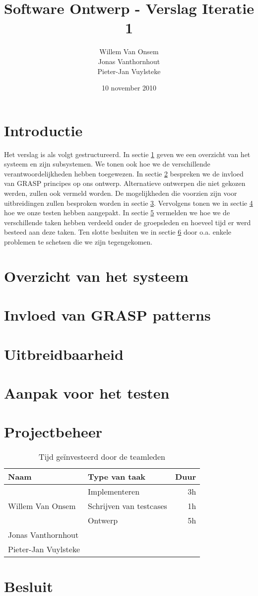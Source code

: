 \documentclass[a4paper, titlepage,12pt]{article}
\title{Software Ontwerp - Verslag Iteratie 1}
\author{Willem Van Onsem\\Jonas Vanthornhout\\Pieter-Jan Vuylsteke}
\date{10 november 2010}
\begin{document}
\begin{titlepage}
\maketitle
\end{titlepage}

\tableofcontents
\newpage
\section*{Introductie}
Het verslag is als volgt gestructureerd. In sectie \ref{overzicht} geven we een overzicht van het systeem en zijn subsystemen.
We tonen ook hoe we de verschillende verantwoordelijkheden hebben toegewezen.
In sectie \ref{grasp} bespreken we de invloed van GRASP principes op ons ontwerp.
Alternatieve ontwerpen die niet gekozen werden, zullen ook vermeld worden.
De mogelijkheden die voorzien zijn voor uitbreidingen zullen besproken worden in sectie \ref{uitbreidbaarheid}.
Vervolgens tonen we in sectie \ref{testen} hoe we onze testen hebben aangepakt.
In sectie \ref{projectbeheer} vermelden we hoe we de verschillende taken hebben verdeeld onder de groepsleden
en hoeveel tijd er werd besteed aan deze taken.
Ten slotte besluiten we in sectie \ref{besluit} door o.a. enkele problemen te schetsen die we zijn tegengekomen.

\newpage
\section{Overzicht van het systeem}
\label{overzicht}
\newpage
\section{Invloed van GRASP patterns}
\label{grasp}
\newpage
\section{Uitbreidbaarheid}
\label{uitbreidbaarheid}
\newpage
\section{Aanpak voor het testen}
\label{testen}
\newpage
\section{Projectbeheer}
\label{projectbeheer}
\begin{table}[H]
\centering
\begin{tabular}{|llr|}
\hline
Naam&Type van taak&Duur\\
\hline
\hline
\multirow{3}{*}{Willem Van Onsem}&Implementeren&3h\\
&Schrijven van testcases&1h\\
&Ontwerp&5h\\
\hline
Jonas Vanthornhout&&\\
\hline
Pieter-Jan Vuylsteke&&\\
\hline
\end{tabular}
\caption{Tijd ge\"investeerd door de teamleden}
\label{tbl:timeUsage}
\end{table}
\newpage
\section{Besluit}
\label{besluit}
\newpage
\nocite{*}


\end{document}

